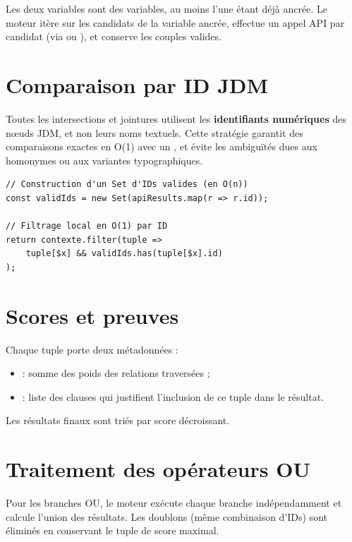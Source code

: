 Les deux variables sont des variables, au moins l'une étant déjà ancrée. Le moteur itère sur les candidats de la variable ancrée, effectue un appel API par candidat (via  ou ), et conserve les couples valides.

\section{Comparaison par ID JDM}

Toutes les intersections et jointures utilisent les \textbf{identifiants numériques} des nœuds JDM, et non leurs noms textuels. Cette stratégie garantit des comparaisons exactes en O(1) avec un , et évite les ambiguïtés dues aux homonymes ou aux variantes typographiques.

\begin{lstlisting}[caption=Comparaison par ID dans le moteur d'exécution]
// Construction d'un Set d'IDs valides (en O(n))
const validIds = new Set(apiResults.map(r => r.id));

// Filtrage local en O(1) par ID
return contexte.filter(tuple =>
    tuple[$x] && validIds.has(tuple[$x].id)
);
\end{lstlisting}

\section{Scores et preuves}

Chaque tuple porte deux métadonnées :
\begin{itemize}
    \item {} : somme des poids des relations traversées ;
    \item {} : liste des clauses qui justifient l'inclusion de ce tuple dans le résultat.
\end{itemize}

Les résultats finaux sont triés par score décroissant.

\section{Traitement des opérateurs OU}

Pour les branches OU, le moteur exécute chaque branche indépendamment et calcule l'union des résultats. Les doublons (même combinaison d'IDs) sont éliminés en conservant le tuple de score maximal.
